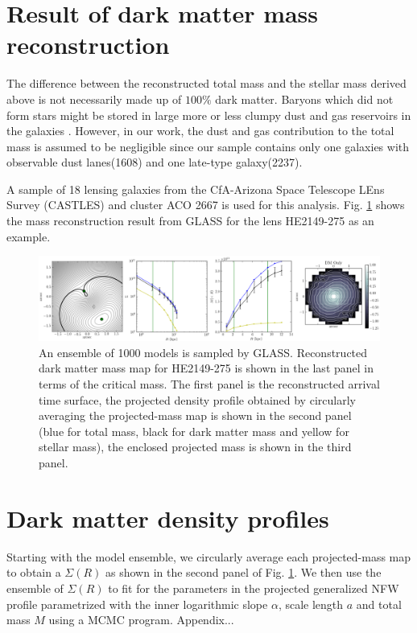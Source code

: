 \documentclass[useAMS,usenatbib]{mn2e}
\begin{document}
\section{Result of dark matter mass reconstruction}\label{mass}

The difference between the reconstructed total mass and the stellar mass derived above is not necessarily made up of $100\%$ dark matter. Baryons which did not form stars might be stored in large more or less clumpy dust and gas reservoirs in the galaxies \citep[e.g.][]{van}. However, in our work, the dust and gas contribution to the total mass is assumed to be negligible since our sample contains only one galaxies with observable dust lanes(1608) and one late-type galaxy(2237).

A sample of 18 lensing galaxies from the CfA-Arizona Space Telescope LEns Survey (CASTLES) and cluster ACO 2667 is used for this analysis. Fig. \ref{f2} shows the mass reconstruction result from GLASS for the lens HE2149-275 as an example. 
\begin{figure}
\begin{center}
\hspace{-7mm}\includegraphics[height=0.27\textwidth]{f2.eps}
\caption{An ensemble of 1000 models is sampled by GLASS. Reconstructed dark matter mass map for HE2149-275 is shown in the last panel in terms of the critical mass. The first panel is the reconstructed arrival time surface, the projected density profile obtained by circularly averaging the projected-mass map is shown in the second panel (blue for total mass, black for dark matter mass and yellow for stellar mass), the enclosed projected mass is shown in the third panel.}
\label{f2}
\end{center}
\end{figure}


\section{Dark matter density profiles} \label{profile}

Starting with the model ensemble, we circularly average each projected-mass map to obtain a $\Sigma(R)$ as shown in the second panel of Fig. \ref{f2}. We then use the ensemble of $\Sigma(R)$ to fit for the parameters in the projected generalized NFW profile parametrized with the inner logarithmic slope $\alpha$, scale length $a$ and total mass $M$
using a MCMC program. Appendix...
\end{document}
